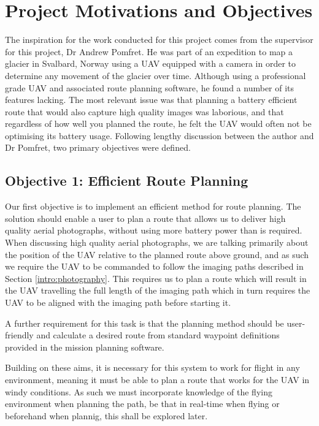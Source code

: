 \section{Project Motivations and Objectives} 
\label{intro:objectives}

The inspiration for the work conducted for this project comes from the supervisor for this project, Dr Andrew Pomfret. He was part of an expedition to map a glacier in Svalbard, Norway using a UAV equipped with a camera in order to determine any movement of the glacier over time. Although using a professional grade UAV and associated route planning software, he found a number of its features lacking. The most relevant issue was that planning a battery efficient route that would also capture high quality images was laborious, and that regardless of how well you planned the route, he felt the UAV would often not be optimising its battery usage. Following lengthy discussion between the author and Dr Pomfret, two primary objectives were defined.

\subsection{Objective 1: Efficient Route Planning}
\label{intro:obj1}
Our first objective is to implement an efficient method for route planning. The solution should enable a user to plan a route that allows us to deliver high quality aerial photographs, without using more battery power than is required. When discussing high quality aerial photographs, we are talking primarily about the position of the UAV relative to the planned route above ground, and as such we require the UAV to be commanded to follow the imaging paths described in Section \ref{intro:photography}. This requires us to plan a route which will result in the UAV travelling the full length of the imaging path which in turn requires the UAV to be aligned with the imaging path before starting it. 

A further requirement for this task is that the planning method should be user-friendly and calculate a desired route from standard waypoint definitions provided in the mission planning software.

Building on these aims, it is necessary for this system to work for flight in any environment, meaning it must be able to plan a route that works for the UAV in windy conditions. As such we must incorporate knowledge of the flying environment when planning the path, be that in real-time when flying or beforehand when plannig, this shall be explored later.

